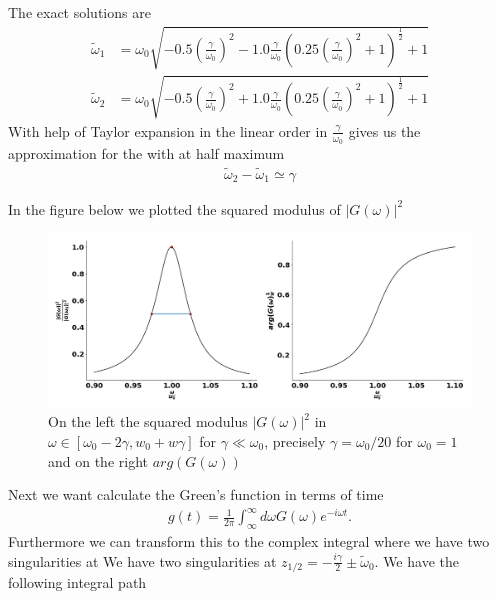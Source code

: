 \documentclass[a4paper]{article}
\begin{document}
The exact solutions are
\begin{align}
    \tilde{\omega}_1 &= \omega_0\sqrt{-0.5\left(\frac{\gamma}{\omega_0}\right)^2
    - 1.0\frac{\gamma}{\omega_0}(0.25\left(\frac{\gamma}{\omega_0}\right)^2
    + 1)^{\frac{1}{2}} + 1}\\
    \tilde{\omega}_2 &= \omega_0\sqrt{-0.5\left(\frac{\gamma}{\omega_0}\right)^2
    + 1.0\frac{\gamma}{\omega_0}(0.25\left(\frac{\gamma}{\omega_0}\right)^2
    + 1)^{\frac{1}{2}} + 1}
\end{align}
With help of Taylor expansion in the linear order in $\frac{\gamma}{\omega_0}$
gives us the approximation for the with at half maximum
\begin{align}
    \tilde{\omega}_2 - \tilde{\omega}_1 \simeq \gamma
\end{align}

In the figure below we plotted the squared modulus of $|G(\omega)|^2$
\begin{figure}[H]
    \centering
    \includegraphics[width=\textwidth]{plots_sec2.png}
    \caption{On the left the squared modulus $|G(\omega)|^2$ in $\omega
\in [\omega_0 - 2\gamma, w_0 + w\gamma]$ for $\gamma \ll \omega_0$, precisely
$\gamma = \omega_0/20$ for $\omega_0 = 1$ and on the right $arg(G(\omega))$}
\end{figure}


Next we want calculate the Green's function in terms of time
\begin{align}
    g(t) = \frac{1}{2\pi} \int^\infty_\infty d\omega G(\omega)e^{-i\omega t}.
\end{align}
Furthermore we can transform this to the complex integral where we have two singularities
at We have two singularities at $z_{1/2} =  - \frac{i\gamma}{2} \pm
\tilde{\omega}_{0}$. We have the following integral
path
\end{document}
